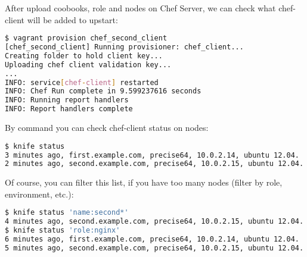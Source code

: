 After upload coobooks, role and nodes on Chef Server, we can check what chef-client will be added to upstart:

\begin{lstlisting}[language=Bash,label=lst:my-server-cloud-knife-ssh9]
$ vagrant provision chef_second_client
[chef_second_client] Running provisioner: chef_client...
Creating folder to hold client key...
Uploading chef client validation key...
...
INFO: service[chef-client] restarted
INFO: Chef Run complete in 9.599237616 seconds
INFO: Running report handlers
INFO: Report handlers complete
\end{lstlisting}

By command  you can check chef-client status on nodes:

\begin{lstlisting}[language=Bash,label=lst:my-server-cloud-knife-ssh10]
$ knife status
3 minutes ago, first.example.com, precise64, 10.0.2.14, ubuntu 12.04.
2 minutes ago, second.example.com, precise64, 10.0.2.15, ubuntu 12.04.
\end{lstlisting}

Of course, you can filter this list, if you have too many nodes (filter by role, environment, etc.):

\begin{lstlisting}[language=Bash,label=lst:my-server-cloud-knife-ssh11]
$ knife status 'name:second*'
4 minutes ago, second.example.com, precise64, 10.0.2.15, ubuntu 12.04.
$ knife status 'role:nginx'
6 minutes ago, first.example.com, precise64, 10.0.2.14, ubuntu 12.04.
5 minutes ago, second.example.com, precise64, 10.0.2.15, ubuntu 12.04.
\end{lstlisting}
